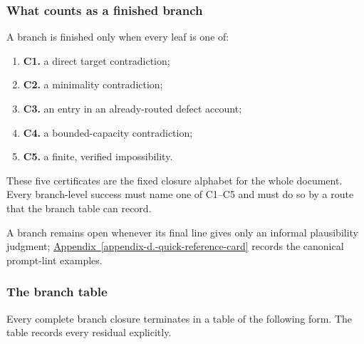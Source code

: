 \documentclass[
  11pt,
]{article}
\providecommand{\tightlist}{%
  \setlength{\itemsep}{0pt}\setlength{\parskip}{0pt}}
\theoremstyle{definition}
\newcommand{\appref}[1]{\hyperref[#1]{Appendix~\ref*{#1}}}
\begin{document}
\subsubsection{What counts as a finished
branch}\label{what-counts-as-a-finished-branch}

A branch is finished only when every leaf is one of:

\begin{enumerate}
\def\labelenumi{\arabic{enumi}.}
\tightlist
\item \textbf{C1.} a direct target contradiction;
\item \textbf{C2.} a minimality contradiction;
\item \textbf{C3.} an entry in an already-routed defect account;
\item \textbf{C4.} a bounded-capacity contradiction;
\item \textbf{C5.} a finite, verified impossibility.
\end{enumerate}

These five certificates are the fixed closure alphabet for the whole
document. Every branch-level success must name one of C1--C5 and must do
so by a route that the branch table can record.

A branch remains open whenever its final line gives only an informal
plausibility judgment; \appref{appendix-d.-quick-reference-card} records
the canonical prompt-lint examples.

\subsubsection{The branch table}\label{the-branch-table}

Every complete branch closure terminates in a table of the following
form. The table records every residual explicitly.
\end{document}

